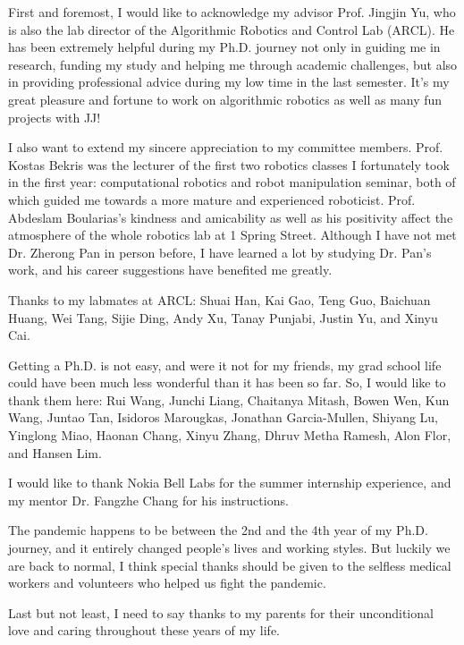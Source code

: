 
\begin{acknowledgments}
First and foremost, I would like to acknowledge my advisor Prof. Jingjin Yu, 
who is also the lab director of the Algorithmic Robotics and Control Lab (ARCL). 
He has been extremely helpful during my Ph.D. journey 
not only in guiding me in research, funding my study and helping me through academic challenges, 
but also in providing professional advice during my low time in the last semester. 
It's my great pleasure and fortune to work on algorithmic robotics 
as well as many fun projects with JJ! 

I also want to extend my sincere appreciation to my committee members. 
Prof. Kostas Bekris was the lecturer of the first two robotics classes I fortunately took in the first year: 
computational robotics and robot manipulation seminar, both of which guided me 
towards a more mature and experienced roboticist. 
Prof. Abdeslam Boularias's kindness and amicability as well as his positivity affect
the atmosphere of the whole robotics lab at 1 Spring Street.
Although I have not met Dr. Zherong Pan in person before, 
I have learned a lot by studying Dr. Pan's work, 
and his career suggestions have benefited me greatly.

Thanks to my labmates at ARCL: Shuai Han, 
Kai Gao, Teng Guo, Baichuan Huang, Wei Tang, Sijie Ding, Andy Xu, Tanay Punjabi, 
Justin Yu, and Xinyu Cai. 

Getting a Ph.D. is not easy, and were it not for my friends, my grad school life 
could have been much less wonderful than it has been so far. 
So, I would like to thank them here: Rui Wang, Junchi Liang, Chaitanya Mitash, Bowen Wen, Kun Wang, Juntao Tan, 
Isidoros Marougkas, Jonathan Garcia-Mullen, Shiyang Lu, Yinglong Miao, Haonan Chang, Xinyu Zhang, 
Dhruv Metha Ramesh, Alon Flor, and Hansen Lim. 

I would like to thank Nokia Bell Labs for the summer internship experience,
and my mentor Dr. Fangzhe Chang for his instructions.

The pandemic happens to be between the 2nd and the 4th year of my Ph.D. journey, 
and it entirely changed people's lives and working styles. 
But luckily we are back to normal, I think special thanks should be given to the 
selfless medical workers and volunteers who helped us fight the pandemic. 

Last but not least, I need to say thanks to my parents for their unconditional love 
and caring throughout these years of my life. 

\end{acknowledgments}
